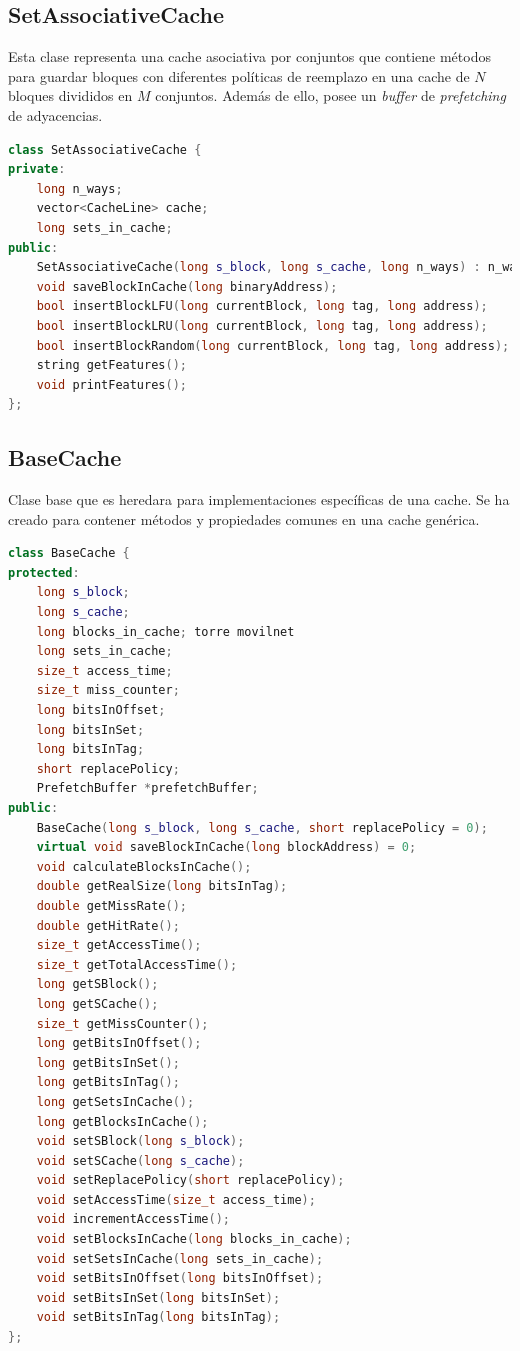 \documentclass[12pt]{article}
\begin{document}
\subsection*{SetAssociativeCache}
\vspace{-5pt}
Esta clase representa una cache asociativa por conjuntos que contiene métodos para guardar bloques con diferentes políticas de reemplazo en una cache de $N$ bloques divididos en $M$ conjuntos. Además de ello, posee un \textit{buffer} de \textit{prefetching} de adyacencias.
\vspace{5pt}
\begin{lstlisting}[language=C++, caption={Declaración de la Clase \lstinline|SetAssociativeCache|}]
class SetAssociativeCache {
private:
	long n_ways;
	vector<CacheLine> cache;
	long sets_in_cache;
public:
	SetAssociativeCache(long s_block, long s_cache, long n_ways) : n_ways(n_ways), sets_in_cache(s_cache / n_ways) {}
	void saveBlockInCache(long binaryAddress);
	bool insertBlockLFU(long currentBlock, long tag, long address);
	bool insertBlockLRU(long currentBlock, long tag, long address);
	bool insertBlockRandom(long currentBlock, long tag, long address);
	string getFeatures();
	void printFeatures();
};
\end{lstlisting}
%
\subsection*{BaseCache}
\vspace{-5pt}
Clase base que es heredara para implementaciones específicas de una cache. Se ha creado para contener métodos y propiedades comunes en una cache genérica.
\vspace{5pt}
\begin{lstlisting}[language=C++, caption={Declaración de la Clase \lstinline|BaseCache|}]
class BaseCache {
protected:
	long s_block;
	long s_cache;
	long blocks_in_cache; torre movilnet
	long sets_in_cache;
	size_t access_time;
	size_t miss_counter;
	long bitsInOffset;
	long bitsInSet;
	long bitsInTag;
	short replacePolicy;
	PrefetchBuffer *prefetchBuffer;
public:
	BaseCache(long s_block, long s_cache, short replacePolicy = 0);
	virtual void saveBlockInCache(long blockAddress) = 0;
	void calculateBlocksInCache();
	double getRealSize(long bitsInTag);
	double getMissRate();
	double getHitRate();
	size_t getAccessTime();
	size_t getTotalAccessTime();
	long getSBlock();
	long getSCache();
	size_t getMissCounter();
	long getBitsInOffset();
	long getBitsInSet();
	long getBitsInTag();
	long getSetsInCache();
	long getBlocksInCache();
	void setSBlock(long s_block);
	void setSCache(long s_cache);
	void setReplacePolicy(short replacePolicy);
	void setAccessTime(size_t access_time);
	void incrementAccessTime();
	void setBlocksInCache(long blocks_in_cache);
	void setSetsInCache(long sets_in_cache);
	void setBitsInOffset(long bitsInOffset);
	void setBitsInSet(long bitsInSet);
	void setBitsInTag(long bitsInTag);
};
\end{lstlisting}
%
\end{document}
